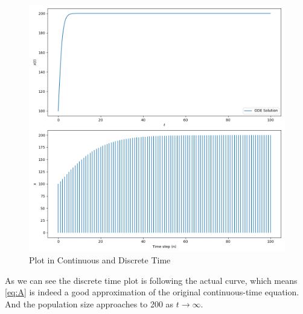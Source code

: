 \documentclass[journal,12pt,twocolumn]{IEEEtran}
\theoremstyle{remark}
\begin{document}
\begin{figure}[h]
    \centering
    \includegraphics[width=\columnwidth]{figs/diff.png}
    \caption{Plot in Continuous and Discrete Time}
\end{figure}
\newline
As we can see the discrete time plot is following the actual curve, which means \eqref{eq:A} is indeed a good approximation of the original continuous-time equation.
\newline
And the population size approaches to 200 as $t \rightarrow \infty$.
\end{document}
